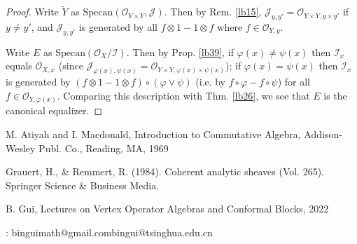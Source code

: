\documentclass[12pt,b5paper,notitlepage]{report}
\theoremstyle{definition}
\theoremstyle{plain}
\newcommand{\mc}{\mathcal}
\newcommand{\wtd}{\widetilde}
\newcommand{\scr}{\mathscr}
\newcommand{\Specan}{\mathrm{Specan}}
\numberwithin{equation}{section}
\begin{document}
\begin{proof}
Write $\wtd Y$ as $\Specan(\scr O_{Y\times Y},\mc J)$. Then by Rem. \ref{lb15}, $\mc J_{y,y'}=\scr O_{Y\times Y,y\times y'}$ if $y\neq y'$, and $\mc J_{y,y'}$ is generated by all $f\otimes 1-1\otimes f$ where $f\in\scr O_{Y,y}$. 

Write $E$ as $\Specan(\scr O_X/\mc I)$. Then by Prop. \ref{lb39}, if $\varphi(x)\neq\psi(x)$ then $\mc I_x$ equals $\scr O_{X,x}$ (since $\mc J_{\varphi(x),\psi(x)}=\scr O_{Y\times Y,\varphi(x)\times\psi(x)}$); if $\varphi(x)=\psi(x)$ then $\mc I_x$ is generated by $(f\otimes 1-1\otimes f)\circ (\varphi\vee\psi)$ (i.e. by $f\circ\varphi-f\circ\psi$) for all $f\in\scr O_{Y,\varphi(x)}$. Comparing this description with Thm. \ref{lb26}, we see that $E$ is the canonical equalizer.
\end{proof}





















































\printindex	
	\begin{thebibliography}{999999}
		\footnotesize	


M. Atiyah and I. Macdonald, Introduction to Commutative Algebra, Addison-Wesley Publ. Co., Reading, MA, 1969



Grauert, H., \& Remmert, R. (1984). Coherent analytic sheaves (Vol. 265). Springer Science \& Business Media.


B. Gui, Lectures on Vertex Operator Algebras and Conformal Blocks, 2022
		
		
\end{thebibliography}


: binguimath@gmail.com\qquad bingui@tsinghua.edu.cn
\end{document}
